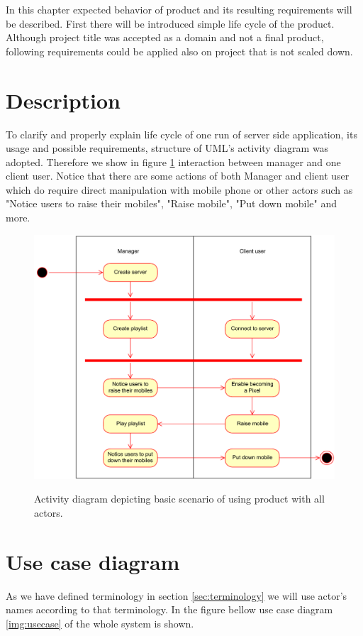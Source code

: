 In this chapter expected behavior of product and its resulting requirements will be described. 
First there will be introduced simple life cycle of the product.
Although project title was accepted as a domain and not a final product, following requirements could be applied also on project that is not scaled down.

\section{Description}
To clarify and properly explain life cycle of one run of server side application, its usage and possible requirements, structure of UML's activity diagram was adopted. 
Therefore we show in figure \ref{img:activity_diagram} interaction between manager and one client user.
Notice that there are some actions of both Manager and client user which do require direct manipulation with mobile phone or other actors such as "Notice users to raise their mobiles", "Raise mobile", "Put down mobile" and more.

\begin{figure}[h!]
    
    \begin{center}
    \includegraphics[scale=0.4]{images/activity_diagram.pdf}
    \label{img:activity_diagram}
    \caption{Activity diagram depicting basic scenario of using product with all actors.}
    \end{center}
\end{figure}


\section{Use case diagram}
As we have defined terminology in section \ref{sec:terminology} we will use actor's names according to that terminology.
In the figure bellow use case diagram \ref{img:usecase} of the whole system  is shown.

